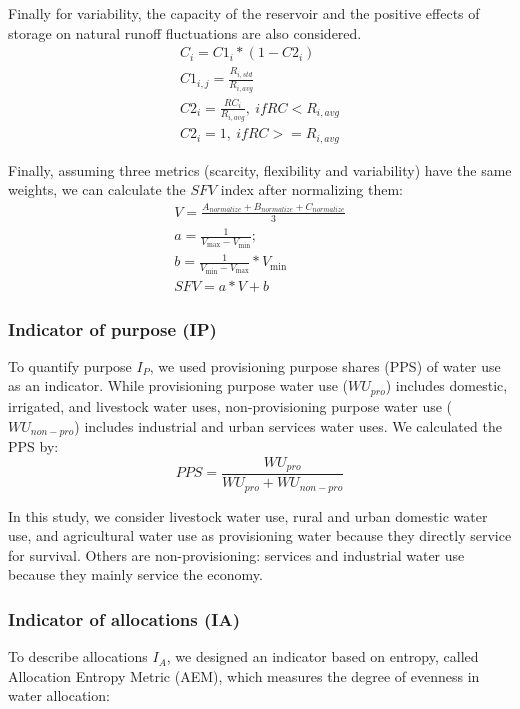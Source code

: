 	Finally for variability, the capacity of the reservoir and the positive effects of storage on natural runoff fluctuations are also considered.
	\begin{gather}
	C_i = C1_i * (1 - C2_i) \\
	C1_{i, j} = \frac{R_{i, std}}{R_{i, avg}} \\
	C2_{i} = \frac{RC_{i}}{R_{i, avg}}, \ if RC < R_{i, avg} \\
	C2_{i} = 1, \ if RC >= R_{i, avg}
	\end{gather}

	Finally, assuming three metrics (scarcity, flexibility and variability) have the same weights, we can calculate the $SFV$ index after normalizing them:
	\begin{gather}
		V = \frac{A_{normalize} + B_{normalize} + C_{normalize}}{3}\\
		a = \frac{1}{V_{\max} - V_{\min}};\\
		b = \frac{1}{V_{\min} - V_{\max}} * V_{\min}\\
		SFV = a * V + b
	\end{gather}

	\subsubsection{Indicator of purpose (IP)}
	To quantify purpose $I_P$, we used provisioning purpose shares (PPS) of water use as an indicator. While provisioning purpose water use ($WU_{pro}$) includes domestic, irrigated, and livestock water uses, non-provisioning purpose water use ($WU_{non-pro}$) includes industrial and urban services water uses. We calculated the PPS by:
	\begin{equation}
		PPS = \frac{WU_{pro}}{WU_{pro} + WU_{non-pro}}
	\end{equation}

	In this study, we consider livestock water use, rural and urban domestic water use, and agricultural water use as provisioning water because they directly service for survival. Others are non-provisioning: services and industrial water use because they mainly service the economy.

	\subsubsection{Indicator of allocations (IA)}
	To describe allocations $I_A$, we designed an indicator based on entropy, called Allocation Entropy Metric (AEM), which measures the degree of evenness in water allocation:

